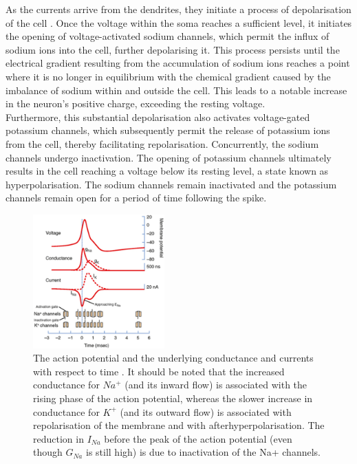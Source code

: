 \noindent As the currents arrive from the dendrites, they initiate a process of depolarisation of the cell \cite{johnston1996active}. Once the voltage within the soma reaches a sufficient level, it initiates the opening of voltage-activated sodium channels, which permit the influx of sodium ions into the cell, further depolarising it. This process persists until the electrical gradient resulting from the accumulation of sodium ions reaches a point where it is no longer in equilibrium with the chemical gradient caused by the imbalance of sodium within and outside the cell. This leads to a notable increase in the neuron's positive charge, exceeding the resting voltage. \\

\noindent Furthermore, this substantial depolarisation also activates voltage-gated potassium channels, which subsequently permit the release of potassium ions from the cell, thereby facilitating repolarisation. Concurrently, the sodium channels undergo inactivation. The opening of potassium channels ultimately results in the cell reaching a voltage below its resting level, a state known as hyperpolarisation. The sodium channels remain inactivated and the potassium channels remain open for a period of time following the spike. \\

\begin{figure}[htbp!] 
    \centering    
    \includegraphics[width=0.45\textwidth]{Chapter2/Figs/b.png}
    \caption[Spiking dynamics of a neuron.]{The action potential and the underlying conductance and currents with respect to time \cite{squire2012fundamental}. It should be noted that the increased conductance for $Na^+$ (and its inward flow) is associated with the rising phase of the action potential, whereas the slower increase in conductance for $K^+$ (and its outward flow) is associated with repolarisation of the membrane and with afterhyperpolarisation. The reduction in $I_{Na}$ before the peak of the action potential (even though $G_{Na}$ is still high) is due to inactivation of the Na+ channels.}
    \label{fig:2b}
\end{figure}

